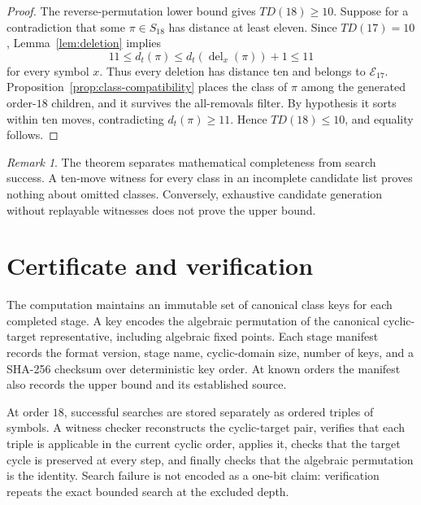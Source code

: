 \documentclass[11pt]{article}
\theoremstyle{definition}
\theoremstyle{remark}
\newtheorem{remark}[theorem]{Remark}
\newcommand{\En}{\mathcal E}
\newcommand{\dist}{d_t}
\newcommand{\Del}{\operatorname{del}}
\begin{document}
\begin{proof}
The reverse-permutation lower bound gives $TD(18)\geq10$.  Suppose for a
contradiction that some $\pi\in S_{18}$ has distance at least eleven.  Since
$TD(17)=10$, Lemma~\ref{lem:deletion} implies
\[
  11\leq\dist(\pi)\leq\dist(\Del_x(\pi))+1\leq11
\]
for every symbol $x$.  Thus every deletion has distance ten and belongs to
$\En_{17}$.  Proposition~\ref{prop:class-compatibility} places the class of
$\pi$ among the generated order-$18$ children, and it survives the
all-removals filter.  By hypothesis it sorts within ten moves, contradicting
$\dist(\pi)\geq11$.  Hence $TD(18)\leq10$, and equality follows.
\end{proof}

\begin{remark}
The theorem separates mathematical completeness from search success.  A
ten-move witness for every class in an incomplete candidate list proves
nothing about omitted classes.  Conversely, exhaustive candidate generation
without replayable witnesses does not prove the upper bound.
\end{remark}

\section{Certificate and verification}\label{sec:certificate}

The computation maintains an immutable set of canonical class keys for each
completed stage.  A key encodes the algebraic permutation of the canonical
cyclic-target representative, including algebraic fixed points.  Each stage
manifest records the format version, stage name, cyclic-domain size, number
of keys, and a SHA-256 checksum over deterministic key order.  At known
orders the manifest also records the upper bound and its established source.

At order $18$, successful searches are stored separately as ordered triples of symbols.  A
witness checker reconstructs the cyclic-target pair, verifies that each
triple is applicable in the current cyclic order, applies it, checks that the
target cycle is preserved at every step, and finally checks that the algebraic
permutation is the identity.  Search failure is not encoded as a one-bit
claim: verification repeats the exact bounded search at the excluded depth.
\end{document}
